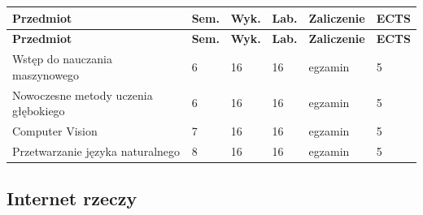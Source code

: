 \documentclass[12pt,a4paper]{article}
\newcommand{\thdrule}{\noalign{\global\setlength{\extrarowheight}{0pt}}}
\newcommand{\thdend}{\noalign{\global\setlength{\extrarowheight}{4pt}}}
\begin{document}
{\scriptsize
\begin{longtable}{m{6.5cm}m{0.7cm}m{1cm}m{1cm}m{1.7cm}m{0.7cm}}
\thdrule\toprule
\rowcolor{pjatkRed}
{\color{white}\footnotesize\textbf{\vphantom{Ag}Przedmiot}} & {\color{white}\footnotesize\textbf{\vphantom{Ag}Sem.}} & {\color{white}\footnotesize\textbf{\vphantom{Ag}Wyk.}} & {\color{white}\footnotesize\textbf{\vphantom{Ag}Lab.}} & {\color{white}\footnotesize\textbf{\vphantom{Ag}Zaliczenie}} & {\color{white}\footnotesize\textbf{\vphantom{Ag}ECTS}} \\
\midrule\thdend
\endfirsthead
\thdrule\toprule
\rowcolor{pjatkRed}
{\color{white}\footnotesize\textbf{\vphantom{Ag}Przedmiot}} & {\color{white}\footnotesize\textbf{\vphantom{Ag}Sem.}} & {\color{white}\footnotesize\textbf{\vphantom{Ag}Wyk.}} & {\color{white}\footnotesize\textbf{\vphantom{Ag}Lab.}} & {\color{white}\footnotesize\textbf{\vphantom{Ag}Zaliczenie}} & {\color{white}\footnotesize\textbf{\vphantom{Ag}ECTS}} \\
\midrule\thdend
\endhead
\rowcolor{tableRowLight} Wstęp do nauczania maszynowego & 6 & 16 & 16 & {\scriptsize egzamin} & 5 \\
\rowcolor{tableRowAlt} Nowoczesne metody uczenia głębokiego & 6 & 16 & 16 & {\scriptsize egzamin} & 5 \\
\rowcolor{tableRowLight} Computer Vision & 7 & 16 & 16 & {\scriptsize egzamin} & 5 \\
\rowcolor{tableRowAlt} Przetwarzanie języka naturalnego & 8 & 16 & 16 & {\scriptsize egzamin} & 5 \\
\bottomrule
\end{longtable}}

\subsection*{Internet rzeczy}
\end{document}
